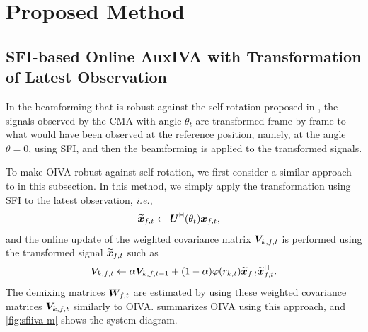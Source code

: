 \documentclass[sip,biber]{now-journal}
\begin{document}
\section{Proposed Method}\label{sec:proposed}


\subsection{SFI-based Online AuxIVA with Transformation of Latest Observation}

In the beamforming that is robust against the self-rotation proposed in \cite{Wakabayashi:2023:ASLP},
the signals observed by the CMA with angle $\theta_t$ are transformed frame by frame to what would have been observed at the reference position,
namely, at the angle $\theta=0$, using SFI, and then the beamforming is applied to the transformed signals.

To make OIVA robust against self-rotation, we first consider a similar approach to \cite{Wakabayashi:2023:ASLP} in this subsection.
In this method, we simply apply the transformation using SFI to the latest observation, \emph{i.e.},
\begin{align}
  \refpos{\Obs} _{\ft} &\gets \rotMat ^{\hermite} (\rotSpat _{\tframe}) \Obs _{\ft},
  \label{eq:sfi:obs}
\end{align}
and the online update of the weighted covariance matrix $\cov _{\src,\ft}$ is performed using the transformed signal $\refpos{\Obs} _{\ft}$ such as
\begin{align}
  \cov _{\src,\ft}\gets \forget \cov _{\src,\ft[-1]} + (1 - \forget) \weight(\var _{\src,\tframe}) \refpos{\Obs} _{\ft} \refpos{\Obs} _{\ft} ^{\hermite}.
  \label{eq:cov:rot}
\end{align}
The demixing matrices $\Demix _{\ft}$ are estimated by using these weighted covariance matrices $\cov _{\src,\ft}$ similarly to OIVA.
 summarizes OIVA using this approach, and \cref{fig:sfiiva-m} shows the system diagram.
\end{document}
